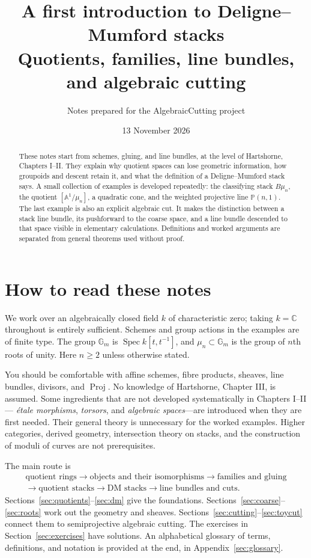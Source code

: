 \documentclass[11pt,a4paper]{article}
\title{A first introduction to Deligne--Mumford stacks\\[5pt]
\large Quotients, families, line bundles, and algebraic cutting}
\author{Notes prepared for the AlgebraicCutting project}
\date{13 November 2026}
\numberwithin{equation}{section}
\theoremstyle{definition}
\newcommand{\A}{\mathbb A}
\newcommand{\PP}{\mathbb P}
\newcommand{\Gm}{\mathbb G_m}
\newcommand{\Spec}{\operatorname{Spec}}
\newcommand{\Proj}{\operatorname{Proj}}
\begin{document}
\maketitle
\begin{abstract}
These notes start from schemes, gluing, and line bundles, at the level of
Hartshorne, Chapters I--II. They explain why quotient spaces can lose geometric
information, how groupoids and descent retain it, and what the definition of a
Deligne--Mumford stack says. A small collection of examples is developed repeatedly:
the classifying stack $B\mu_n$, the quotient $[\A^1/\mu_n]$, a quadratic cone,
and the weighted projective line $\PP(n,1)$. The last example is also an explicit
algebraic cut. It makes the distinction between a stack line bundle, its
pushforward to the coarse space, and a line bundle descended to that space visible
in elementary calculations. Definitions and worked arguments are separated from
general theorems used without proof.
\end{abstract}
\tableofcontents
\newpage

\section{How to read these notes}
\label{sec:reading}

We work over an algebraically closed field $k$ of characteristic zero; taking
$k=\mathbb C$ throughout is entirely sufficient. Schemes and group actions in the
examples are of finite type. The group $\Gm$ is $\Spec k[t,t^{-1}]$, and
$\mu_n\subset\Gm$ is the group of $n$th roots of unity. Here $n\geq2$ unless
otherwise stated.

You should be comfortable with affine schemes, fibre products, sheaves, line
bundles, divisors, and $\Proj$. No knowledge of Hartshorne, Chapter III, is assumed.
Some ingredients that are not developed systematically in Chapters I--II---
\emph{étale morphisms}, \emph{torsors}, and \emph{algebraic spaces}---are introduced
when they are first needed. Their general theory is unnecessary for the worked
examples. Higher categories, derived geometry, intersection theory on stacks, and
the construction of moduli of curves are not prerequisites.

The main route is
\[
\begin{gathered}
\text{quotient rings}\longrightarrow\text{objects and their isomorphisms}
\longrightarrow\text{families and gluing}\\
\longrightarrow\text{quotient stacks}\longrightarrow\text{DM stacks}
\longrightarrow\text{line bundles and cuts}.
\end{gathered}
\]
Sections~\ref{sec:quotients}--\ref{sec:dm} give the foundations.
Sections~\ref{sec:coarse}--\ref{sec:roots} work out the geometry and sheaves.
Sections~\ref{sec:cutting}--\ref{sec:toycut} connect them to semiprojective
algebraic cutting. The exercises in Section~\ref{sec:exercises} have solutions.
An alphabetical glossary of terms, definitions, and notation is provided
at the end, in Appendix~\ref{sec:glossary}.
\end{document}
